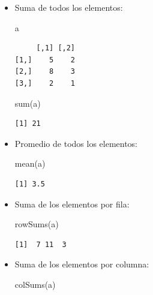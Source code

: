\documentclass[
]{book}
\newenvironment{Shaded}{\begin{snugshade}}{\end{snugshade}}
\newcommand{\FunctionTok}[1]{\textcolor[rgb]{0.00,0.00,0.00}{#1}}
\newcommand{\NormalTok}[1]{#1}
\begin{document}
\begin{itemize}
\item
  Suma de todos los elementos:

\begin{Shaded}
\begin{Highlighting}[]
\NormalTok{a}
\end{Highlighting}
\end{Shaded}

\begin{verbatim}
     [,1] [,2]
[1,]    5    2
[2,]    8    3
[3,]    2    1
\end{verbatim}

\begin{Shaded}
\begin{Highlighting}[]
\FunctionTok{sum}\NormalTok{(a)}
\end{Highlighting}
\end{Shaded}

\begin{verbatim}
[1] 21
\end{verbatim}
\item
  Promedio de todos los elementos:

\begin{Shaded}
\begin{Highlighting}[]
\FunctionTok{mean}\NormalTok{(a)}
\end{Highlighting}
\end{Shaded}

\begin{verbatim}
[1] 3.5
\end{verbatim}
\item
  Suma de los elementos por fila:

\begin{Shaded}
\begin{Highlighting}[]
\FunctionTok{rowSums}\NormalTok{(a)}
\end{Highlighting}
\end{Shaded}

\begin{verbatim}
[1]  7 11  3
\end{verbatim}
\item
  Suma de los elementos por columna:

\begin{Shaded}
\begin{Highlighting}[]
\FunctionTok{colSums}\NormalTok{(a)}
\end{Highlighting}
\end{Shaded}


\end{itemize}
\end{document}
